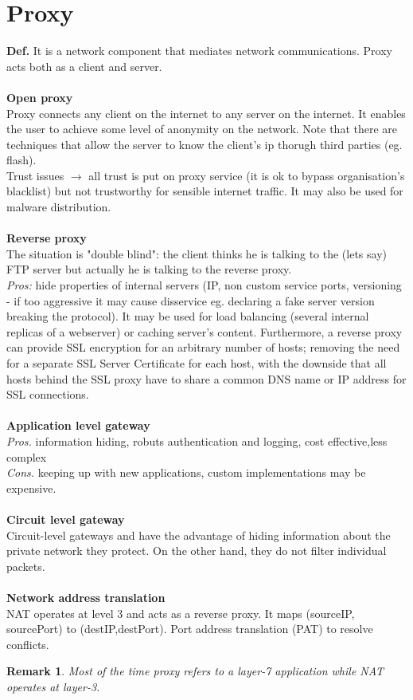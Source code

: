 \documentclass[10pt,a4paper]{book}
\newtheorem{remark}{Remark}
\begin{document}
\section{Proxy}
\textbf{Def.} It is a network component that mediates network communications. Proxy acts both as a client and server.\\\\
\textbf{Open proxy}\\
Proxy connects any client on the internet to any server on the internet. It enables the user to achieve some level of anonymity on the network. Note that there are techniques that allow the server to know the client's ip thorugh third parties (eg. flash). \\
Trust issues $\to$ all trust is put on proxy service (it is ok to bypass organisation's blacklist) but not trustworthy for sensible internet traffic. It may also be used for malware distribution.\\\\
\textbf{Reverse proxy}\\
The situation is "double blind": the client thinks he is talking to the (lets say) FTP server but actually he is talking to the reverse proxy.\\
\emph{Pros:} hide properties of internal servers (IP, non custom service ports, versioning - if too aggressive it may cause disservice eg. declaring a fake server version breaking the protocol). It may be used for load balancing (several internal replicas of a webserver) or caching server's content. Furthermore, a reverse proxy can provide SSL encryption for an arbitrary number of hosts; removing the need for a separate SSL Server Certificate for each host, with the downside that all hosts behind the SSL proxy have to share a common DNS name or IP address for SSL connections.\\\\
\textbf{Application level gateway}\\
\emph{Pros.} information hiding, robuts authentication and logging, cost effective,less complex\\
\emph{Cons.} keeping up with new applications, custom implementations may be expensive.\\\\
\textbf{Circuit level gateway}\\
Circuit-level gateways and have the advantage of hiding information about the private network they protect. On the other hand, they do not filter individual packets.\\\\
\textbf{Network address translation}\\
NAT operates at level 3 and acts as a reverse proxy. It maps (sourceIP, sourcePort) to (destIP,destPort). Port address translation (PAT) to resolve conflicts.
\begin{remark}
Most of the time proxy refers to a layer-7 application while NAT operates at layer-3.
\end{remark}
\end{document}
